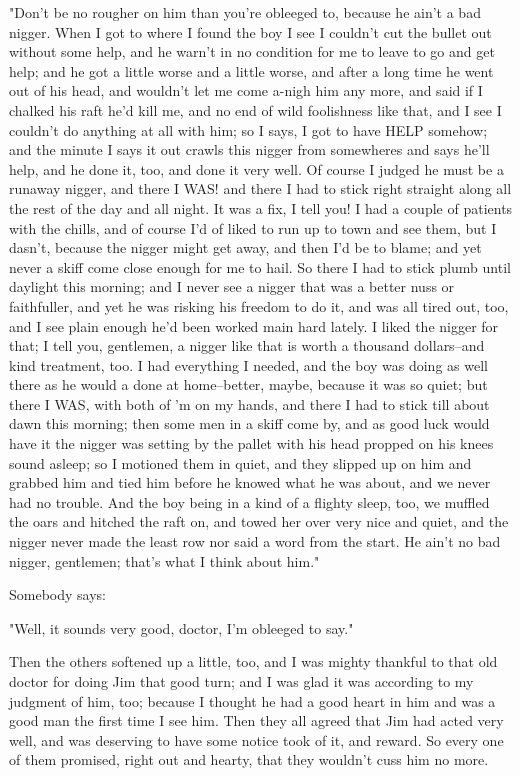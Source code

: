 "Don't be no rougher on him than you're obleeged to, because he ain't a
bad nigger.  When I got to where I found the boy I see I couldn't cut the
bullet out without some help, and he warn't in no condition for me to
leave to go and get help; and he got a little worse and a little worse,
and after a long time he went out of his head, and wouldn't let me come
a-nigh him any more, and said if I chalked his raft he'd kill me, and no
end of wild foolishness like that, and I see I couldn't do anything at
all with him; so I says, I got to have HELP somehow; and the minute I
says it out crawls this nigger from somewheres and says he'll help, and
he done it, too, and done it very well.  Of course I judged he must be a
runaway nigger, and there I WAS! and there I had to stick right straight
along all the rest of the day and all night.  It was a fix, I tell you!
I had a couple of patients with the chills, and of course I'd of liked to
run up to town and see them, but I dasn't, because the nigger might get
away, and then I'd be to blame; and yet never a skiff come close enough
for me to hail.  So there I had to stick plumb until daylight this
morning; and I never see a nigger that was a better nuss or faithfuller,
and yet he was risking his freedom to do it, and was all tired out, too,
and I see plain enough he'd been worked main hard lately.  I liked the
nigger for that; I tell you, gentlemen, a nigger like that is worth a
thousand dollars--and kind treatment, too.  I had everything I needed,
and the boy was doing as well there as he would a done at home--better,
maybe, because it was so quiet; but there I WAS, with both of 'm on my
hands, and there I had to stick till about dawn this morning; then some
men in a skiff come by, and as good luck would have it the nigger was
setting by the pallet with his head propped on his knees sound asleep; so
I motioned them in quiet, and they slipped up on him and grabbed him and
tied him before he knowed what he was about, and we never had no trouble.
And the boy being in a kind of a flighty sleep, too, we muffled the oars
and hitched the raft on, and towed her over very nice and quiet, and the
nigger never made the least row nor said a word from the start.  He ain't
no bad nigger, gentlemen; that's what I think about him."

Somebody says:

"Well, it sounds very good, doctor, I'm obleeged to say."

Then the others softened up a little, too, and I was mighty thankful to
that old doctor for doing Jim that good turn; and I was glad it was
according to my judgment of him, too; because I thought he had a good
heart in him and was a good man the first time I see him.  Then they all
agreed that Jim had acted very well, and was deserving to have some
notice took of it, and reward.  So every one of them promised, right out
and hearty, that they wouldn't cuss him no more.

